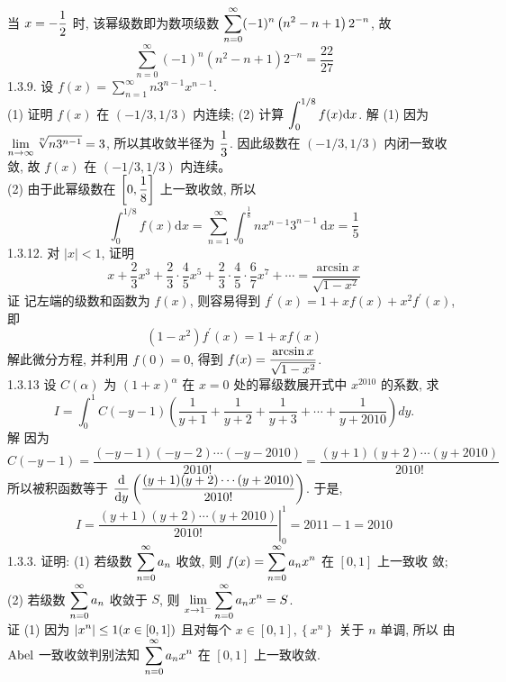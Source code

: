 \documentclass[a4paper,11pt,UTF8]{article}
\begin{document}
当 $\displaystyle \displaystyle x=-\frac{1}{2}$ 时, 该幂级数即为数项级数 $\displaystyle \displaystyle \sum_{n=0}^{\infty}(-1)^n\left(n^2-n+1\right) 2^{-n}$, 故
$$
\sum_{n=0}^{\infty}(-1)^n\left(n^2-n+1\right) 2^{-n}=\frac{22}{27}
$$
1.3.9. 设 $\displaystyle f(x)=\sum_{n=1}^{\infty} n 3^{n-1} x^{n-1}$.\\
(1) 证明 $\displaystyle f(x)$ 在 $(-1 / 3,1 / 3)$ 内连续; (2) 计算 $\displaystyle \displaystyle \int_0^{1 / 8} f(x) \mathrm{d} x$.
解 (1) 因为 $\displaystyle \displaystyle \lim _{n \rightarrow \infty} \sqrt[n]{n 3^{n-1}}=3$, 所以其收敛半径为 $\displaystyle \displaystyle \frac{1}{3}$. 因此级数在 $(-1 / 3,1 / 3)$ 内闭一致收敛, 故 $\displaystyle f(x)$ 在 $(-1 / 3,1 / 3)$ 内连续。\\
(2) 由于此幂级数在 $\displaystyle \displaystyle \left[0, \frac{1}{8}\right]$ 上一致收敛, 所以
$$
\int_0^{1 / 8} f(x) \mathrm{d} x=\sum_{n=1}^{\infty} \int_0^{\frac{1}{8}} n x^{n-1} 3^{n-1} \mathrm{~d} x=\frac{1}{5}
$$
1.3.12. 对 $|x|<1$, 证明
$$
x+\frac{2}{3} x^3+\frac{2}{3} \cdot \frac{4}{5} x^5+\frac{2}{3} \cdot \frac{4}{5} \cdot \frac{6}{7} x^7+\cdots=\frac{\arcsin x}{\sqrt{1-x^2}}
$$
证 记左端的级数和函数为 $\displaystyle f(x)$, 则容易得到 $\displaystyle f^{\prime}(x)=1+x f(x)+x^2 f^{\prime}(x)$, 即
$$
\left(1-x^2\right) f^{\prime}(x)=1+x f(x)
$$
解此微分方程, 并利用 $\displaystyle f(0)=0$, 得到 $\displaystyle \displaystyle f(x)=\frac{\arcsin x}{\sqrt{1-x^2}}$.\\
1.3.13 设 $C(\alpha)$ 为 $(1+x)^\alpha$ 在 $x=0$ 处的幂级数展开式中 $x^{2010}$ 的系数, 求
$$
I=\int_0^1 C(-y-1)\left(\frac{1}{y+1}+\frac{1}{y+2}+\frac{1}{y+3}+\cdots+\frac{1}{y+2010}\right) d y .
$$
解 因为
$$
C(-y-1)=\frac{(-y-1)(-y-2) \cdots(-y-2010)}{2010 !}=\frac{(y+1)(y+2) \cdots(y+2010)}{2010 !}
$$
所以被积函数等于 $\displaystyle \displaystyle \frac{\mathrm{d}}{\mathrm{d} y}\left(\frac{(y+1)(y+2) \cdots(y+2010)}{2010 !}\right)$. 于是,
$$
I=\left.\frac{(y+1)(y+2) \cdots(y+2010)}{2010 !}\right|_0 ^1=2011-1=2010
$$
1.3.3. 证明: (1) 若级数 $\displaystyle \displaystyle \sum_{n=0}^{\infty} a_n$ 收敛, 则 $\displaystyle \displaystyle f(x)=\sum_{n=0}^{\infty} a_n x^n$ 在 $[0,1]$ 上一致收 敛; (2) 若级数 $\displaystyle \displaystyle \sum_{n=0}^{\infty} a_n$ 收敛于 $S$, 则 $\displaystyle \displaystyle \lim _{x \rightarrow 1^{-}} \sum_{n=0}^{\infty} a_n x^n=S$.\\
证 (1) 因为 $\displaystyle \displaystyle \left|x^n\right| \leq 1(x \in[0,1])$ 且对每个 $x \in[0,1],\left\{x^n\right\}$ 关于 $n$ 单调, 所以 由 $\displaystyle \displaystyle \mathrm{Abel}$ 一致收敛判别法知 $\displaystyle \displaystyle \sum_{n=0}^{\infty} a_n x^n$ 在 $[0,1]$ 上一致收敛.\\
\end{document}
